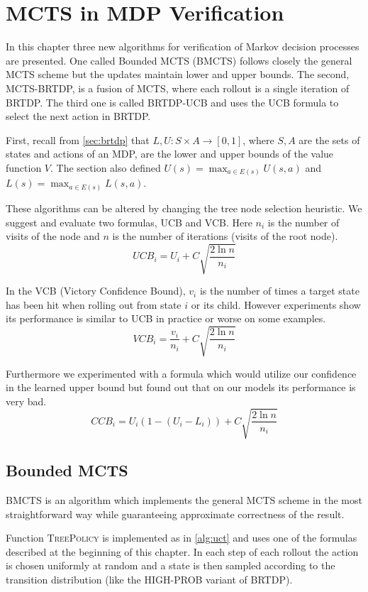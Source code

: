 \chapter{MCTS in MDP Verification}

In this chapter three new algorithms for verification of Markov decision
processes are presented. One called Bounded MCTS (BMCTS) follows
closely the general MCTS scheme but the updates maintain lower and upper
bounds. The second, MCTS-BRTDP, is a fusion of MCTS, where each
rollout is a single iteration of BRTDP.  The third one is called
BRTDP-UCB and uses the UCB formula to select the next action in BRTDP.

First, recall from \autoref{sec:brtdp} that $L,U : S \times
A \to [0,1]$, where $S, A$ are the sets of states and actions of an MDP,
are the lower and upper bounds of the value function $V$.
The section also defined
$U(s) = \max_{a \in E(s)} U(s, a)$
and
$L(s) = \max_{a \in E(s)} L(s, a)$.

These algorithms can be altered by changing the tree node selection
heuristic. We suggest and evaluate two formulas, UCB and VCB.
Here $n_i$ is the number of visits of the node and $n$ is the number of
iterations (visits of the root node).
\begin{equation*}
    UCB_i = U_i + C \sqrt{ \frac{2 \ln n}{n_i} }
\end{equation*}

In the VCB (Victory Confidence Bound), $v_i$ is the number of times a
target state has been hit when rolling out from state $i$ or its child.
However experiments show its performance is similar to UCB in
practice or worse on some examples.
\[
    VCB_i = \frac{v_i}{n_i} + C \sqrt{ \frac{2 \ln n}{n_i} }
\]

Furthermore we experimented with a formula which would utilize our
confidence in the learned upper bound but found out that on our models
its performance is very bad.
\[
    CCB_i = U_i (1 - (U_i - L_i)) + C \sqrt{ \frac{2 \ln n}{n_i} }
\]

\pagebreak

\section{Bounded MCTS}

BMCTS is an algorithm which implements the general MCTS scheme in the
most straightforward way while guaranteeing approximate correctness of
the result.

Function \textsc{TreePolicy} is implemented as in
\autoref{alg:uct} and uses one of the formulas
described at the beginning of this chapter.
In each step of each rollout the action is chosen
uniformly at random and a state is then sampled according to the
transition distribution (like the HIGH-PROB variant of BRTDP).

